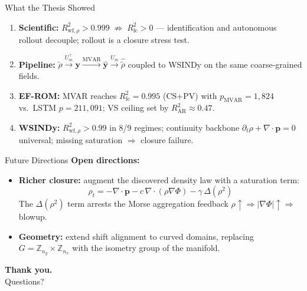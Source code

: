 
\begin{frame}[shrink=6]{What the Thesis Showed}
\normalsize
\begin{enumerate}\setlength{\itemsep}{0.6em}
  \item \textbf{Scientific:} $R^2_{\mathrm{wf},\rho}{>}0.999\;\not\Rightarrow\; R^2_{\mathrm{fc}}{>}0$ --- identification and autonomous rollout decouple; rollout is a closure stress test.

  \item \textbf{Pipeline:} $\tilde\rho\xrightarrow{U_m^\top}\mathbf{y}\xrightarrow{\text{MVAR}}\hat{\mathbf{y}}\xrightarrow{U_m}\hat{\tilde\rho}$ coupled to WSINDy on the same coarse-grained fields.

  \item \textbf{EF-ROM:} MVAR reaches $R^2_{\mathrm{fc}}{=}0.995$ (CS+PV) with $p_{\mathrm{MVAR}}{=}1{,}824$ vs.\ LSTM $p{=}211{,}091$; VS ceiling set by $R^2_{\mathrm{AR}}\approx 0.47$.

  \item \textbf{WSINDy:} $R^2_{\mathrm{wf},\rho}{>}0.99$ in 8/9 regimes; continuity backbone $\partial_t\rho{+}\nabla\!\cdot\mathbf{p}{=}0$ universal; missing saturation $\Rightarrow$ closure failure.
\end{enumerate}
\end{frame}

\begin{frame}{Future Directions}
\large\textbf{Open directions:}\normalsize
\begin{itemize}\setlength{\itemsep}{0.8em}
  \item \textbf{Richer closure:} augment the discovered density law with a saturation term:
  \[
    \rho_t = -\nabla\!\cdot\mathbf{p} - c\,\nabla\!\cdot(\rho\nabla\Phi) - \gamma\,\Delta(\rho^2)
  \]
  The $\Delta(\rho^2)$ term arrests the Morse aggregation feedback $\rho\uparrow\Rightarrow|\nabla\Phi|\uparrow\Rightarrow$ blowup.
  \item \textbf{Geometry:} extend shift alignment to curved domains, replacing $G=\mathbb{Z}_{n_y}\times\mathbb{Z}_{n_x}$ with the isometry group of the manifold.
\end{itemize}
\end{frame}

\begin{frame}[plain]
\vspace*{\fill}
\centering
{\Huge\bfseries\color{BrownPrimary} Thank you.}
\\[1.2em]
{\LARGE Questions?}
\vspace*{\fill}
\end{frame}
